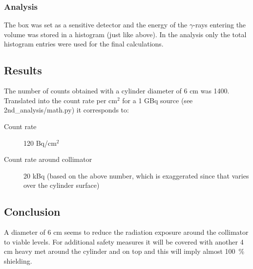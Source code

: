 \documentclass[a4paper]{article}
\begin{document}
\subsubsection{Analysis}
The box was set as a sensitive detector and the energy of the $\gamma$-rays entering the volume was stored in a histogram (just like above). In the analysis only the total histogram entries were used for the final calculations.

\subsection{Results}
The number of counts obtained with a cylinder diameter of 6 cm was 1400.
Translated into the count rate per cm$^2$ for a 1 GBq source (see 2nd\_analysis/math.py) it corresponds to:
\begin{description}
  \item[Count rate] 120 Bq/cm$^2$
  \item[Count rate around collimator] 20 kBq (based on the above number, which is exaggerated since that varies over the cylinder surface)
\end{description}

\subsection{Conclusion}
A diameter of 6 cm seems to reduce the radiation exposure around the collimator to viable levels.
For additional safety measures it will be covered with another 4 cm heavy met around the cylinder and on top and this will imply almost 100~\% shielding.






\end{document}
